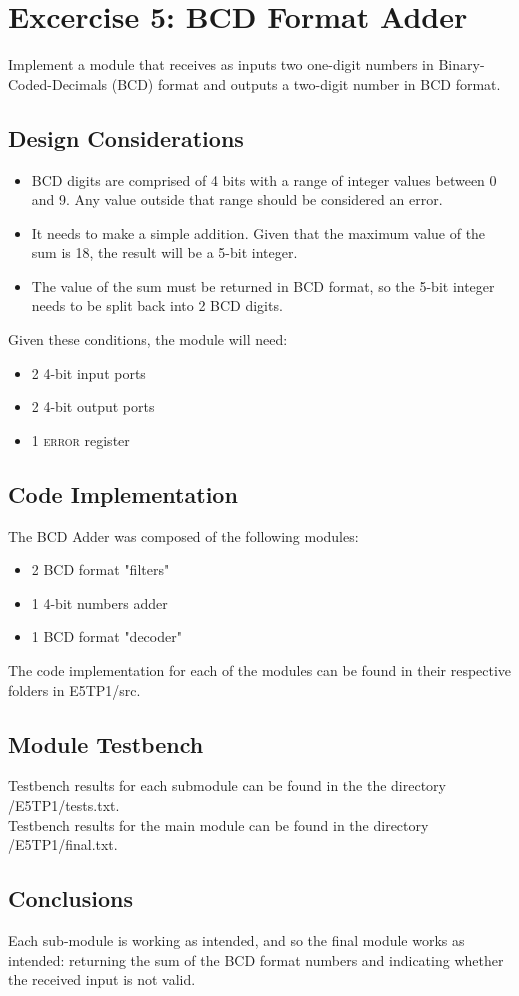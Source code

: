 \section {\color{olive}Excercise 5: BCD Format Adder}
Implement a module that receives as inputs two one-digit numbers in Binary-Coded-Decimals (BCD) format and outputs a two-digit number in BCD format.

\subsection{\color{purple}Design Considerations}
\begin{itemize}
\item BCD digits are comprised of 4 bits with a range of integer values between 0 and 9. Any value outside that range should be considered an error.
\item It needs to make a simple addition. Given that the maximum value of the sum is 18, the result will be a 5-bit integer.
\item The value of the sum must be returned in BCD format, so the 5-bit integer needs to be split back into 2 BCD digits.
\end{itemize}

Given these conditions, the module will need:
\begin{itemize}
\item 2 4-bit input ports
\item 2 4-bit output ports
\item 1 \textsc{error} register
\end{itemize}

\subsection{\color{purple}Code Implementation}
The BCD Adder was composed of the following modules:
\begin{itemize}
\item 2 BCD format "filters"
\item 1 4-bit numbers adder
\item 1 BCD format "decoder"
\end{itemize}

The code implementation for each of the modules can be found in their respective folders in E5TP1/src.

\subsection{\color{purple}Module Testbench}
Testbench results for each submodule can be found in the the directory /E5TP1/tests.txt.\\
Testbench results for the main module can be found in the directory /E5TP1/final.txt.

\subsection{\color{purple}Conclusions}
Each sub-module is working as intended, and so the final module works as intended: returning the sum of
the BCD format numbers and indicating whether the received input is not valid.
